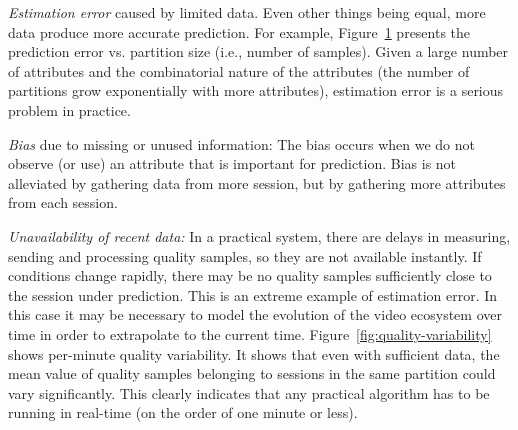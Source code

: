 \begin{packedenumerate}
\item \emph{Estimation error} caused by limited data.  Even other
  things being equal, more data produce more accurate prediction. For
  example, Figure~\ref{fig:group-size-impact} presents the prediction
  error vs. partition size (i.e., number of samples). Given a large number
  of attributes and the combinatorial nature of the attributes (the
  number of partitions grow exponentially with more attributes),
  estimation error is a serious problem in practice.


\begin{figure}[h!]
\centering
{}
\label{fig:group-size-impact}
\end{figure}

\item \emph{Bias} due to missing or unused information: The bias occurs when we do not observe (or use) an attribute that is important for prediction. Bias is not alleviated by gathering data from more session, but by gathering more attributes from each session.

\item \emph{Unavailability of recent data:} In a practical system, there are delays in measuring, sending and processing quality samples, so they are not available instantly.  If conditions change rapidly, there may be no quality samples sufficiently close to the session under prediction.  This is an extreme example of estimation error.  In this case it may be necessary to model the evolution of the video ecosystem over time in order to extrapolate to the current time. Figure~\ref{fig:quality-variability} shows per-minute quality variability. It shows that even with sufficient data, the mean value of quality samples belonging to sessions in the same partition could vary significantly. This clearly indicates that any practical algorithm has to be running in real-time (on the order of one minute or less).


\end{packedenumerate}
